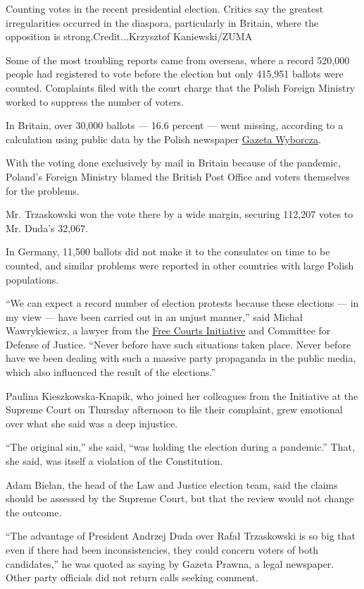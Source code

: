Counting votes in the recent presidential election. Critics say the
greatest irregularities occurred in the diaspora, particularly in
Britain, where the opposition is strong.Credit...Krzysztof
Kaniewski/ZUMA

Some of the most troubling reports came from overseas, where a record
520,000 people had registered to vote before the election but only
415,951 ballots were counted. Complaints filed with the court charge
that the Polish Foreign Ministry worked to suppress the number of
voters.

In Britain, over 30,000 ballots --- 16.6 percent --- went missing,
according to a calculation using public data by the Polish newspaper
\href{https://wyborcza.pl/0,0.html}{Gazeta Wyborcza}.

With the voting done exclusively by mail in Britain because of the
pandemic, Poland's Foreign Ministry blamed the British Post Office and
voters themselves for the problems.

Mr. Trzaskowski won the vote there by a wide margin, securing 112,207
votes to Mr. Duda's 32,067.

In Germany, 11,500 ballots did not make it to the consulates on time to
be counted, and similar problems were reported in other countries with
large Polish populations.

``We can expect a record number of election protests because these
elections --- in my view --- have been carried out in an unjust
manner,'' said Michał Wawrykiewicz, a lawyer from the
\href{https://www.facebook.com/WolneSady/}{Free Courts Initiative} and
Committee for Defense of Justice. ``Never before have such situations
taken place. Never before have we been dealing with such a massive party
propaganda in the public media, which also influenced the result of the
elections.''

Paulina Kieszkowska-Knapik, who joined her colleagues from the
Initiative at the Supreme Court on Thursday afternoon to file their
complaint, grew emotional over what she said was a deep injustice.

``The original sin,'' she said, ``was holding the election during a
pandemic.'' That, she said, was itself a violation of the Constitution.

Adam Bielan, the head of the Law and Justice election team, said the
claims should be assessed by the Supreme Court, but that the review
would not change the outcome.

``The advantage of President Andrzej Duda over Rafał Trzaskowski is so
big that even if there had been inconsistencies, they could concern
voters of both candidates,'' he was quoted as saying by Gazeta Prawna, a
legal newspaper. Other party officials did not return calls seeking
comment.

